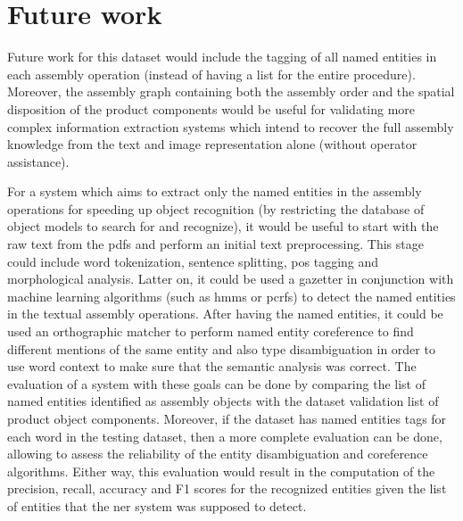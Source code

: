 \section{Future work}\label{sec:future-work}

Future work for this dataset would include the tagging of all named entities in each assembly operation (instead of having a list for the entire procedure). Moreover, the assembly graph containing both the assembly order and the spatial disposition of the product components would be useful for validating more complex information extraction systems which intend to recover the full assembly knowledge from the text and image representation alone (without operator assistance).

For a system which aims to extract only the named entities in the assembly operations for speeding up object recognition (by restricting the database of object models to search for and recognize), it would be useful to start with the raw text from the \glspl{pdf} and perform an initial text preprocessing. This stage could include word tokenization, sentence splitting, \gls{pos} tagging and morphological analysis. Latter on, it could be used a gazetter in conjunction with machine learning algorithms (such as \glspl{hmm} or \glspl{pcrf}) to detect the named entities in the textual assembly operations. After having the named entities, it could be used an orthographic matcher to perform named entity coreference to find different mentions of the same entity and also type disambiguation in order to use word context to make sure that the semantic analysis was correct. The evaluation of a system with these goals can be done by comparing the list of named entities identified as assembly objects with the dataset validation list of product object components. Moreover, if the dataset has named entities tags for each word in the testing dataset, then a more complete evaluation can be done, allowing to assess the reliability of the entity disambiguation and coreference algorithms. Either way, this evaluation would result in the computation of the precision, recall, accuracy and F1 scores for the recognized entities given the list of entities that the \gls{ner} system was supposed to detect.
